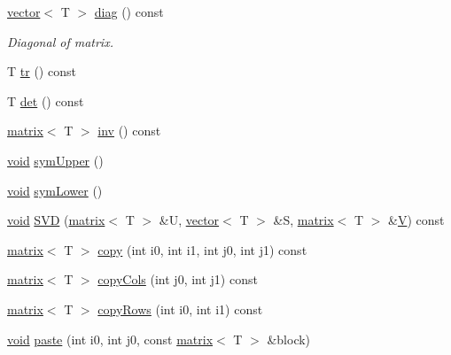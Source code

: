 \begin{DoxyCompactItemize}
\hyperlink{classlibNumerics_1_1vector}{vector}$<$ T $>$ \hyperlink{classlibNumerics_1_1matrix_a0e5781d987d2cbb5b7730efcbfbfa8bf}{diag} () const 
\begin{DoxyCompactList}\small\item\em Diagonal of matrix. \end{DoxyCompactList}\item 
T \hyperlink{classlibNumerics_1_1matrix_a5e3b2c3b2c1b0489c2a042794e6477f9}{tr} () const 
\item 
T \hyperlink{classlibNumerics_1_1matrix_a0642d8f3e189d40bbc81c3da0f2e071c}{det} () const 
\item 
\hyperlink{classlibNumerics_1_1matrix}{matrix}$<$ T $>$ \hyperlink{classlibNumerics_1_1matrix_acce38f32de9ccd314ea0a62fe0874b21}{inv} () const 
\item 
\hyperlink{png_8h_aa8c59027f9ab2769342f248709d68d17}{void} \hyperlink{classlibNumerics_1_1matrix_a316e65764397ef860e2491e5a7ad30e5}{sym\+Upper} ()
\item 
\hyperlink{png_8h_aa8c59027f9ab2769342f248709d68d17}{void} \hyperlink{classlibNumerics_1_1matrix_a3c37373227fa3391346828c94616bc1a}{sym\+Lower} ()
\item 
\hyperlink{png_8h_aa8c59027f9ab2769342f248709d68d17}{void} \hyperlink{classlibNumerics_1_1matrix_aed6daac6f9a67968f9ad13f98c745973}{S\+V\+D} (\hyperlink{classlibNumerics_1_1matrix}{matrix}$<$ T $>$ \&U, \hyperlink{classlibNumerics_1_1vector}{vector}$<$ T $>$ \&S, \hyperlink{classlibNumerics_1_1matrix}{matrix}$<$ T $>$ \&\hyperlink{jaricom_8c_af20c591dd6cbdf45ad772686aa4b9f30}{V}) const 
\item 
\hyperlink{classlibNumerics_1_1matrix}{matrix}$<$ T $>$ \hyperlink{classlibNumerics_1_1matrix_aad042c4154a1d402b2186955392f6b00}{copy} (int i0, int i1, int j0, int j1) const 
\item 
\hyperlink{classlibNumerics_1_1matrix}{matrix}$<$ T $>$ \hyperlink{classlibNumerics_1_1matrix_abdea96008578d7382c3c5f1f444afed7}{copy\+Cols} (int j0, int j1) const 
\item 
\hyperlink{classlibNumerics_1_1matrix}{matrix}$<$ T $>$ \hyperlink{classlibNumerics_1_1matrix_a64fce5c41c4263c75f18f3dfcca06596}{copy\+Rows} (int i0, int i1) const 
\item 
\hyperlink{png_8h_aa8c59027f9ab2769342f248709d68d17}{void} \hyperlink{classlibNumerics_1_1matrix_a75640f0e92b7ed87eb189c9e079998be}{paste} (int i0, int j0, const \hyperlink{classlibNumerics_1_1matrix}{matrix}$<$ T $>$ \&block)
\item 

\end{DoxyCompactItemize}
